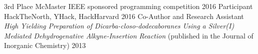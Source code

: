 \begin{cvhonors}
\cvhonor
{3rd Place}
{McMaster IEEE sponsored programming competition}
{}
{2016}
\cvhonor
{Participant}
{HackTheNorth, YHack, HackHarvard}
{}
{2016}
\cvhonor
{Co-Author and Research Assistant}
{\textit{High Yielding Preparation of Dicarba-closo-dodecaboranes Using a Silver(I) Mediated Dehydrogenative Alkyne-Insertion Reaction} (published in the Journal of Inorganic Chemistry)}
{}
{2013}

\end{cvhonors}
